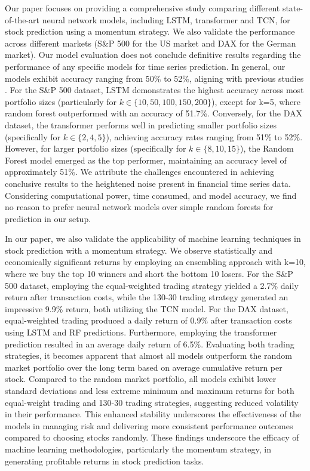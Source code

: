 \documentclass{article}
\begin{document}
Our paper focuses on providing a comprehensive study comparing different state-of-the-art neural network models, including LSTM, transformer and TCN, for stock prediction using a momentum strategy. We also validate the performance across different markets (S\&P 500 for the US market and DAX for the German market). Our model evaluation does not conclude definitive results regarding the performance of any specific models for time series prediction. In general, our models exhibit accuracy ranging from 50\% to 52\%, aligning with previous studies \citep{fischer2018deep}. For the S\&P 500 dataset, LSTM demonstrates the highest accuracy across most portfolio sizes (particularly for $k \in \{10, 50, 100, 150, 200\}$), except for k=5, where random forest outperformed with an accuracy of 51.7\%. Conversely, for the DAX dataset, the transformer performs well in predicting smaller portfolio sizes (specifically for $k \in \{2, 4, 5\}$), achieving accuracy rates ranging from 51\% to 52\%. However, for larger portfolio sizes (specifically for $k \in \{8, 10, 15\}$), the Random Forest model emerged as the top performer, maintaining an accuracy level of approximately 51\%. We attribute the challenges encountered in achieving conclusive results to the heightened noise present in financial time series data. Considering computational power, time consumed, and model accuracy, we find no reason to prefer neural network models over simple random forests for prediction in our setup.

In our paper, we also validate the applicability of machine learning techniques in stock prediction with a momentum strategy. We observe statistically and economically significant returns by employing an ensembling approach with k=10, where we buy the top 10 winners and short the bottom 10 losers. For the S\&P 500 dataset, employing the equal-weighted trading strategy yielded a 2.7\% daily return after transaction costs, while the 130-30 trading strategy generated an impressive 9.9\% return, both utilizing the TCN model. For the DAX dataset, equal-weighted trading produced a daily return of 0.9\% after transaction costs using LSTM and RF predictions. Furthermore, employing the transformer prediction resulted in an average daily return of 6.5\%. Evaluating both trading strategies, it becomes apparent that almost all models outperform the random market portfolio over the long term based on average cumulative return per stock. Compared to the random market portfolio, all models exhibit lower standard deviations and less extreme minimum and maximum returns for both equal-weight trading and 130-30 trading strategies, suggesting reduced volatility in their performance. This enhanced stability underscores the effectiveness of the models in managing risk and delivering more consistent performance outcomes compared to choosing stocks randomly. These findings underscore the efficacy of machine learning methodologies, particularly the momentum strategy, in generating profitable returns in stock prediction tasks.
\end{document}
